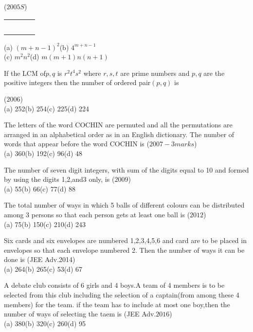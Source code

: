 \documentclass[journal,12pt,twocolumn]{IEEEtran}
\theoremstyle{remark}
\begin{document}
\begin{enumerate}
\hfill{($2005S$)}\\
\begin{center}
\begin{tabular}{|c|c|c|c|}
\hline
\quad&\quad&\quad&\quad\\
\hline
\quad&\quad&\quad&\quad\\
\hline
\quad&\quad&\quad&\quad\\
\hline\quad&\quad&\quad&\quad\\
\hline\quad&\quad&\quad&\quad\\
\hline\quad&\quad&\quad&\quad\\
\hline
\end{tabular}
\end{center}
(a) $(m+n-1)^2$\quad(b) $4^{m+n-1}$\\
(c) $m^2n^2$\quad(d) $m(m+1)n(n+1)$
\item[10.] If the LCM of$p,q$ is $r^2t^4s^2$ where $r,s,t$ are prime numbers and $p,q$ are the positive integers then the number of ordered pair$(p,q)$ is \hfill{($2006$)\\
(a) 252\quad(b) 254\quad(c) 225\quad(d) 224
\item[11.]The letters of the word COCHIN are permuted and all the permutations are arranged in an alphabetical order as in an English dictionary. The number of words that appear before the word COCHIN is
\hfill{($2007-3 marks$)}\\
(a) 360\quad(b) 192\quad(c) 96\quad(d) 48
\item[12.]The number of seven digit integers, with sum of the digits equal to 10 and formed by using the digits 1,2,and3 only, is
\hfill{($2009$)}\\
(a) 55\quad(b) 66\quad(c) 77\quad(d) 88
\item[13.]The total number of ways in which 5 balls of different colours can be distributed among 3 persons so that each person gets at least one ball is
\hfill{($2012$)}\\
(a) 75\quad(b) 150\quad(c) 210\quad(d) 243
\item[14.]Six cards and six envelopes are numbered 1,2,3,4,5,6 and card are to be placed in envelopes so that each envelope numbered 2. Then the number of ways it can be done is
\hfill{(JEE Adv.2014)}\\
(a) 264\quad(b) 265\quad(c) 53\quad(d) 67
\item[15.]A debate club consists of 6 girls and 4 boys.A team of 4 members is to be selected from this club including the selection of a captain(from among these 4 members) for the team. if the team has to include at most one boy,then the number of ways of selecting the taem is
\hfill{(JEE Adv.$2016$)}\\
(a) 380\quad(b) 320\quad(c) 260\quad(d) 95
}
\end{enumerate}
\end{document}
